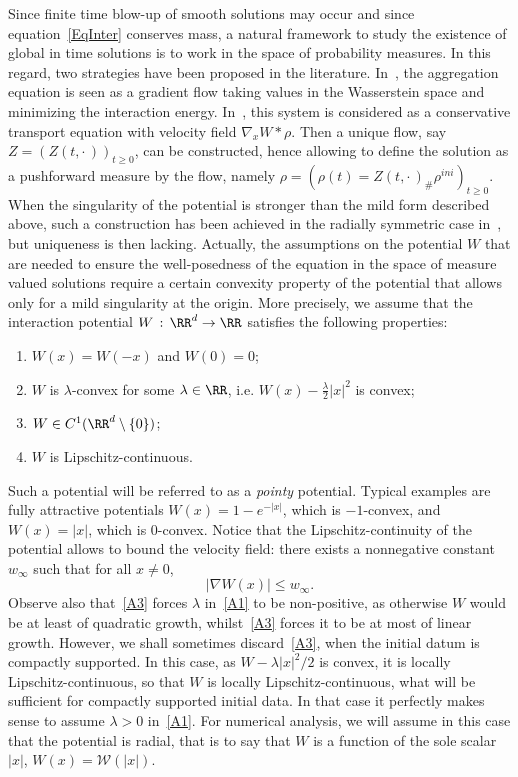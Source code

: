 Since finite time blow-up of smooth solutions may occur and since equation~\eqref{EqInter} conserves mass, a natural framework to study the existence of global in time solutions is to work in the space of probability measures. In this regard, two strategies have been proposed in the literature. In~\cite{Carrillo}, the aggregation equation is seen as a gradient flow taking values in the Wasserstein space and minimizing the interaction energy. In~\cite{CJLV,NoDEA,GF_dual,lava}, this system is considered as a conservative transport equation with velocity field $\nabla_x W*\rho$. Then a unique flow, say $Z=(Z(t,{\cdot\,}))_{t \geq 0}$, can be constructed, hence allowing to define the solution as a pushforward measure by the flow, namely $\rho=(\rho(t)=Z(t,{\cdot\,})_\# \rho^{ini})_{t \ge 0}$. When the singularity of the potential is stronger than the mild form described above, such a construction has been achieved in the radially symmetric case in~\cite{Andrea_c_toaa}, but uniqueness is then lacking. Actually, the assumptions on the potential $W$ that are needed to ensure the well-posedness of the equation in the space of measure valued solutions require a certain convexity property of the potential that allows only for a mild singularity at the origin. More precisely, we assume that the interaction potential $W\,:\,\RR^d\to\RR$ satisfies the following properties:
\begin{enumerate}\renewcommand*{\theenumi}{A\arabic{enumi}}
\item \label{A0} $W(x)=W(-x)$ and $W(0)=0$;
\item \label{A1} $W$ is $\lambda$-convex for some {$\lambda \in \RR$}, i.e. $W(x)-\frac{\lambda}{2}|x|^2$ is convex;
\item \label{A2} $W\in C^1(\RR^d\setminus\{0\})$;
\item \label{A3} $W$ is Lipschitz-continuous.
\end{enumerate}
Such a potential will be referred to as a \emph{pointy} potential. Typical examples are fully attractive potentials $W(x)=1-e^{-|x|}$, which is $-1$-convex, and $W(x) = |x|$, which is $0$-convex. Notice that the Lipschitz-continuity of the potential allows to bound the velocity field: there exists a nonnegative constant $w_\infty$ such that for all $x\neq 0$,
\begin{equation}\label{borngradW}
|\nabla W(x)| \leq w_\infty.
\end{equation}
Observe also that~\eqref{A3} forces $\lambda$ in~\eqref{A1} to be non-positive, as otherwise $W$ would be at least of quadratic growth, whilst~\eqref{A3} forces it to be at most of linear growth. However, we shall sometimes discard~\eqref{A3}, when the initial datum is compactly supported. In this case, as $W - \lambda |x|^2/2$ is convex, it is locally Lipschitz-continuous, so that $W$ is locally Lipschitz-continuous, what will be sufficient for compactly supported initial data. In that case it perfectly makes sense to assume $\lambda >0$ in~\eqref{A1}. For numerical analysis, we will assume in this case that the potential is radial, that is to say that $W$ is a function of the sole scalar $|x|$, $W(x) = \mathcal{W}(|x|)$.

